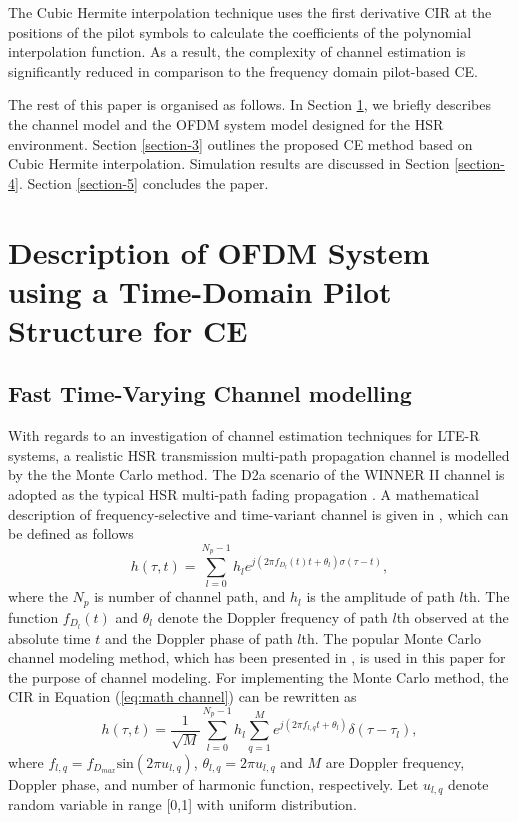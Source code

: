 \documentclass[AMA]{WileyNJD-v1}
\begin{document}
The Cubic Hermite interpolation technique  uses the first derivative CIR at  the positions of the pilot symbols to calculate the coefficients of the polynomial interpolation function. As a result, the complexity of channel estimation is significantly reduced in comparison to the frequency domain pilot-based CE. 

	
The rest of this paper is organised as follows. In Section \ref{section-2}, we briefly describes the channel model and the OFDM system model designed for the HSR environment. Section \ref{section-3} outlines the proposed CE method based on Cubic Hermite interpolation. Simulation results are discussed in Section \ref{section-4}. Section \ref{section-5} concludes the paper.
	
	
\section{Description of OFDM System using a Time-Domain Pilot Structure for CE}\label{section-2}
	
\subsection{Fast Time-Varying Channel modelling}\label{section-2.1}

With regards to an investigation of channel estimation techniques for LTE-R systems, a realistic HSR transmission multi-path propagation channel is modelled by the the Monte Carlo method. The D2a scenario of the WINNER II channel is adopted as the typical HSR multi-path fading propagation \cite{Guan2011}. A mathematical description of frequency-selective and time-variant channel is given in \cite{Matz2011}, which can be defined as follows
%
\begin{equation}\label{eq:math channel}
	h(\tau,t)=\sum_{l=0}^{N_p-1}h_l e^{j(2\pi f_{D_l}(t)t+\theta_{l})\sigma (\tau-t)},
\end{equation}
%
where the $N_{p}$ is number of channel path, and $h_{l}$ is the amplitude of path $l$th. The function $f_{D_l}(t)$ and $\theta_{l}$ denote the Doppler frequency of path $l$th observed at the absolute time $t$ and the Doppler phase of path $l$th. The popular Monte Carlo channel modeling method, which has been presented in \cite{Nguyen2004}, is used in this paper for the purpose of channel modeling. For implementing the Monte Carlo method, the CIR in Equation (\ref{eq:math channel}) can be rewritten as
%
\begin{equation}\label{eq-math Monte channel}
	h(\tau,t)=\frac{1}{\sqrt{M}}\sum_{l=0}^{N_p-1}h_{l}\sum_{q=1}^{M}e^{j(2\pi f_{l,q}t+\theta_{l})}\delta(\tau-\tau_{l}),
\end{equation}
%
where $f_{l,q} = f_{D_{max}} \text{sin}(2\pi u_{l,q})$, $\theta_{l,q} = 2\pi u_{l,q}$ and $M$ are Doppler frequency, Doppler phase, and number of harmonic function, respectively. Let $u_{l,q}$ denote random variable in range [0,1] with uniform distribution. 
	
\end{document}
